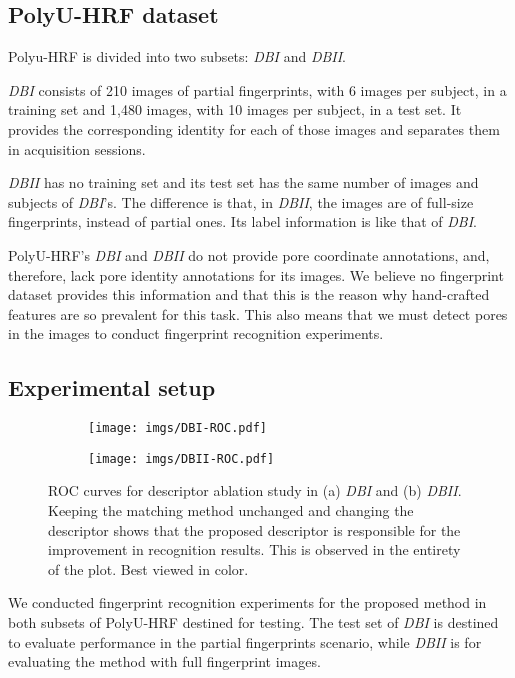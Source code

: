 \documentclass[10pt,twocolumn,letterpaper]{article}
\begin{document}
\subsection{PolyU-HRF dataset}
\label{sec:dataset}
Polyu-HRF is divided into two subsets: \textit{DBI} and \textit{DBII}.

\textit{DBI} consists of 210 images of partial fingerprints, with 6 images per subject, in a training set and 1,480 images, with 10 images per subject, in a test set.
It provides the corresponding identity for each of those images and separates them in acquisition sessions.

\textit{DBII} has no training set and its test set has the same number of images and subjects of \textit{DBI}'s.
The difference is that, in \textit{DBII}, the images are of full-size fingerprints, instead of partial ones.
Its label information is like that of \textit{DBI}.

PolyU-HRF's \textit{DBI} and \textit{DBII} do not provide pore coordinate annotations, and, therefore, lack pore identity annotations for its images.
We believe no fingerprint dataset provides this information and that this is the reason why hand-crafted features are so prevalent for this task.
This also means that we must detect pores in the images to conduct fingerprint recognition experiments.

\subsection{Experimental setup}

\begin{figure*}
    \begin{subfigure}{0.5\linewidth}
      \texttt{[image: imgs/DBI-ROC.pdf]}
      \caption{\label{fig:roc1}}
    \end{subfigure}
    \begin{subfigure}{0.5\linewidth}
      \texttt{[image: imgs/DBII-ROC.pdf]}
      \caption{\label{fig:roc2}}
    \end{subfigure}
  \caption{ROC curves for descriptor ablation study in (a) \textit{DBI} and (b) \textit{DBII}.
  Keeping the matching method unchanged and changing the descriptor shows that the proposed descriptor is responsible for the improvement in recognition results.
  This is observed in the entirety of the plot.
  Best viewed in color.}
  \label{fig:rocs}
\end{figure*}

We conducted fingerprint recognition experiments for the proposed method in both subsets of PolyU-HRF destined for testing.
The test set of \textit{DBI} is destined to evaluate performance in the partial fingerprints scenario, while \textit{DBII} is for evaluating the method with full fingerprint images.
\end{document}
